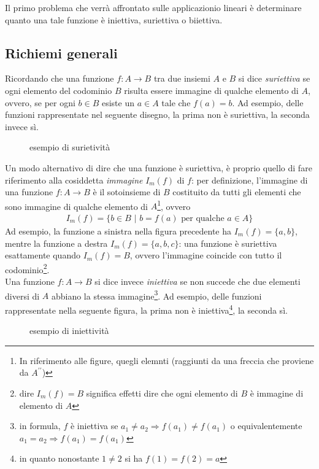 \documentclass{book}
\theoremstyle{definition}
\theoremstyle{plain}
\begin{document}
Il primo problema che verrà affrontato sulle applicazionio lineari è determinare quanto
una tale funzione è iniettiva, suriettiva o biiettiva.

\subsection{Richiemi generali}
\label{sec:richgen}

Ricordando che una funzione $f:A\to B$ tra due insiemi $A$ e $B$ si dice \emph{suriettiva}
se ogni elemento del codominio $B$ risulta essere immagine di qualche elemento di $A$,
ovvero, se per ogni $b\in B$ esiste un $a\in A$ tale che $f(a)=b$. Ad esempio, delle
funzioni rappresentate nel seguente disegno, la prima non è suriettiva, la seconda invece sì.
\clearpage
\begin{figure}[ht!]
  \centering
  \resizebox{10cm}{!}{}
  \caption{esempio di surietività}
  \label{fig:ricgendelfab}
\end{figure}
Un modo alternativo di dire che una funzione è suriettiva, è proprio quello di fare riferimento
alla cosiddetta \textit{immagine} $I_m(f)$ di $f$: per definizione, l'immagine di una funzione
$f:A\to B$ è il sotoinsieme di $B$ costituito da tutti gli elementi che sono immagine di qualche
elemento di $A$\footnote{In riferimento alle figure, quegli elemnti (raggiunti da una freccia che
  proviene da $A^{\prime\prime}$)}, ovvero
\begin{eqnarray*}
  I_m(f)=\{b\in B\text{ | }b=f(a) \text{ per qualche } a\in A\}
\end{eqnarray*}
Ad esempio, la funzione a sinistra nella figura precedente ha $I_m(f)=\{a,b\}$, mentre la funzione
a destra $I_m(f)=\{a,b,c\}$: una funzione è suriettiva esattamente quando $I_m(f)=B$, ovvero l'immagine
coincide con tutto il codominio\footnote{dire $I_m(f)=B$ significa effetti dire che ogni elemento di
  $B$ è immagine di elemento di $A$}.\\
Una funzione $f:A\to B$ si dice invece \textit{iniettiva} se non succede che due elementi diversi di $A$
abbiano la stessa immagine\footnote{in formula, $f$ è iniettiva se $a_1\neq a_2\Rightarrow
  f(a_1)\neq f(a_1)$ o equivalentemente $a_1= a_2\Rightarrow f(a_1)= f(a_1)$}. Ad esempio, delle funzioni
rappresentate nella seguente figura, la prima non è iniettiva\footnote{in quanto nonostante $1\neq 2$
  si ha $f(1)=f(2)=a$}, la seconda sì.
\begin{figure}[ht!]
  \centering
  \resizebox{10cm}{!}{}
  \caption{esempio di iniettività}
  \label{fig:ricgendelfab2}
\end{figure}
\end{document}

